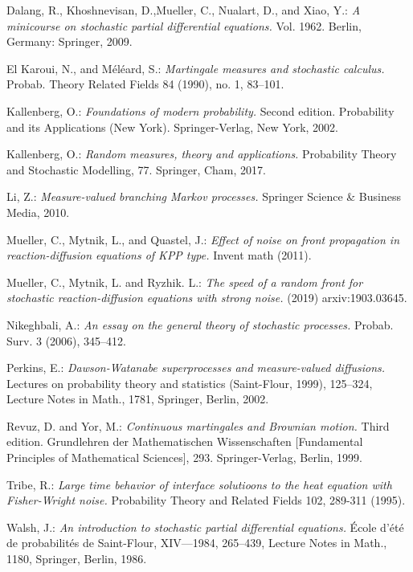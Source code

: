 \documentclass[12pt,a4paper]{amsart}
\numberwithin{equation}{section}
\theoremstyle{plain}
\theoremstyle{remark}
\begin{document}
\begin{thebibliography}{99}
	
	Dalang, R., Khoshnevisan, D.,Mueller, C., Nualart, D., and Xiao, Y.:
	\emph{A minicourse on stochastic partial differential equations.}
	Vol. 1962. Berlin, Germany: Springer, 2009. 
	
	El Karoui, N., and M\'el\'eard, S.:
	\emph{Martingale measures and stochastic calculus.}
	Probab. Theory Related Fields 84 (1990), no. 1, 83–101.
	
	Kallenberg, O.:
	\emph{Foundations of modern probability.}
	Second edition. Probability and its Applications (New York). Springer-Verlag, New York, 2002.
	
	Kallenberg, O.:
	\emph{Random measures, theory and applications.}
	Probability Theory and Stochastic Modelling, 77. Springer, Cham, 2017.
	
	Li, Z.: 
	\emph{Measure-valued branching Markov processes.} 
	Springer Science \& Business Media, 2010.	
	
	Mueller, C., Mytnik, L., and Quastel, J.:
	\emph{Effect of noise on front propagation in reaction-diffusion equations of KPP type.}
	Invent math (2011).
	
	Mueller, C., Mytnik, L. and Ryzhik. L.: 
	\emph{The speed of a random front for stochastic reaction-diffusion equations with strong noise.} 
	(2019) arxiv:1903.03645.
	
	Nikeghbali, A.:
	\emph{An essay on the general theory of stochastic processes.}
	Probab. Surv. 3 (2006), 345–412.
	
	Perkins, E.:
	\emph{Dawson-Watanabe superprocesses and measure-valued diffusions.} 
	Lectures on probability theory and statistics (Saint-Flour, 1999), 125–324, Lecture Notes in Math., 1781, Springer, Berlin, 2002.
	
	Revuz, D. and Yor, M.:
	\emph{Continuous martingales and Brownian motion.}
	Third edition. Grundlehren der Mathematischen Wissenschaften [Fundamental Principles of Mathematical Sciences], 293. Springer-Verlag, Berlin, 1999.

	Tribe, R.:
	\emph{Large time behavior of interface solutioons to the heat equation with Fisher-Wright noise.}
	Probability Theory and Related Fields 102, 289-311 (1995).
	
	Walsh, J.:
	\emph{An introduction to stochastic partial differential equations.} 
	\'Ecole d'\'et\'e de probabilit\'es de Saint-Flour, XIV—1984, 265–439, Lecture Notes in Math., 1180, Springer, Berlin, 1986.

\end{thebibliography}
\end{document}

